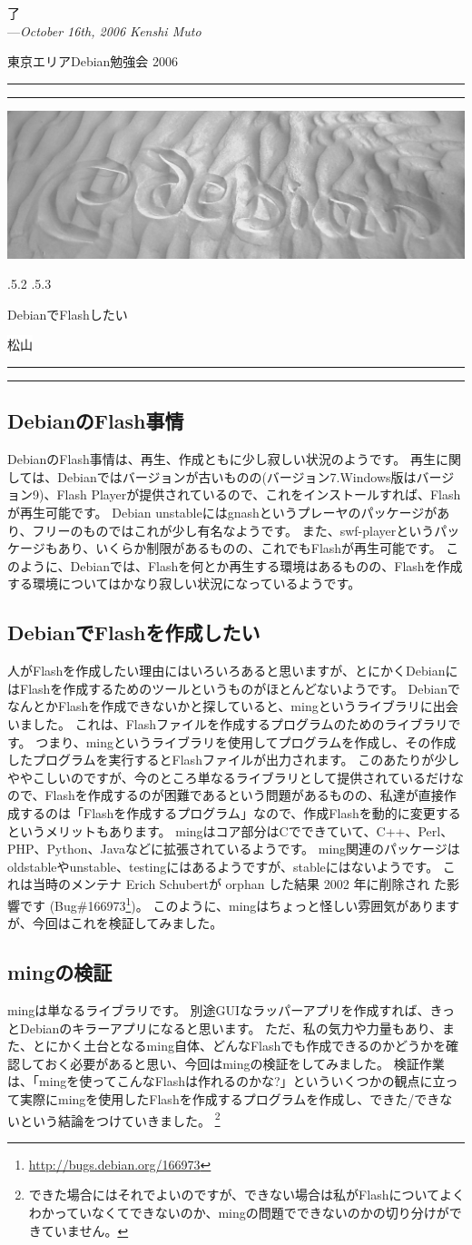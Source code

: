 \documentclass[mingoth,a4paper]{jsarticle}
\makeatletter
\renewcommand{\section}{\@startsection{section}{1}{\z@}%
    {\Cvs \@plus.5\Cdp \@minus.2\Cdp}%
    {.5\Cvs \@plus.3\Cdp}%
    {\normalfont\Huge\headfont\raggedright\centering}} %
\newcommand{\dancersection}[2]{%
\newpage
東京エリアDebian勉強会 2006
\hrule
\vspace{0.5mm}
\hrule
\hfill{}\includegraphics[width=16cm]{image2006-natsu/guruguru-sand-light.png}\\
\vspace{-5cm}
\begin{center}
\section{#1}
\end{center}
\hfill{}\colorbox{white}{#2}\hspace{3cm}\space\\
\vspace{1cm}
\hrule
\vspace{0.5mm}
\hrule
\vspace{1cm}
}
\newcommand{\debianbug}[1]{Bug\##1\footnote{\url{http://bugs.debian.org/#1}}}
\makeatother
\begin{document}
\begin{flushright}
  了\\
  ---\emph{October 16th, 2006 Kenshi Muto}
\end{flushright}



\dancersection{DebianでFlashしたい}{松山}

\subsection{DebianのFlash事情}
DebianのFlash事情は、再生、作成ともに少し寂しい状況のようです。
再生に関しては、Debianではバージョンが古いものの(バージョン7.Windows版はバージョン9)、Flash Playerが提供されているので、これをインストールすれば、Flashが再生可能です。
Debian unstableにはgnashというプレーヤのパッケージがあり、フリーのものではこれが少し有名なようです。
また、swf-playerというパッケージもあり、いくらか制限があるものの、これでもFlashが再生可能です。
このように、Debianでは、Flashを何とか再生する環境はあるものの、Flashを作成する環境についてはかなり寂しい状況になっているようです。

\subsection{DebianでFlashを作成したい}
人がFlashを作成したい理由にはいろいろあると思いますが、とにかくDebianにはFlashを作成するためのツールというものがほとんどないようです。
DebianでなんとかFlashを作成できないかと探していると、mingというライブラリに出会いました。
これは、Flashファイルを作成するプログラムのためのライブラリです。
つまり、mingというライブラリを使用してプログラムを作成し、その作成したプログラムを実行するとFlashファイルが出力されます。
このあたりが少しややこしいのですが、今のところ単なるライブラリとして提供されているだけなので、Flashを作成するのが困難であるという問題があるものの、私達が直接作成するのは「Flashを作成するプログラム」なので、作成Flashを動的に変更するというメリットもあります。
mingはコア部分はCでできていて、C++、Perl、PHP、Python、Javaなどに拡張されているようです。
ming関連のパッケージはoldstableやunstable、testingにはあるようですが、stableにはないようです。
これは当時のメンテナ Erich Schubertが orphan した結果 2002 年に削除され
た影響です (\debianbug{166973})。
このように、mingはちょっと怪しい雰囲気がありますが、今回はこれを検証してみました。

\subsection{mingの検証}
mingは単なるライブラリです。
別途GUIなラッパーアプリを作成すれば、きっとDebianのキラーアプリになると思います。
ただ、私の気力や力量もあり、また、とにかく土台となるming自体、どんなFlashでも作成できるのかどうかを確認しておく必要があると思い、今回はmingの検証をしてみました。
検証作業は、「mingを使ってこんなFlashは作れるのかな?」といういくつかの観点に立って実際にmingを使用したFlashを作成するプログラムを作成し、できた/できないという結論をつけていきました。
\footnote{できた場合にはそれでよいのですが、できない場合は私がFlashについてよくわかっていなくてできないのか、mingの問題でできないのかの切り分けができていません。}
\end{document}

